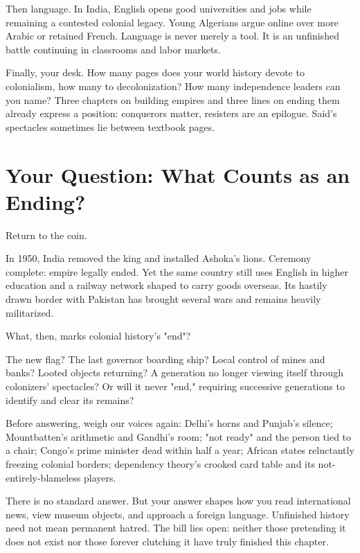 Then language. In India, English opens good universities and jobs while remaining a contested colonial legacy. Young Algerians argue online over more Arabic or retained French. Language is never merely a tool. It is an unfinished battle continuing in classrooms and labor markets.

Finally, your desk. How many pages does your world history devote to colonialism, how many to decolonization? How many independence leaders can you name? Three chapters on building empires and three lines on ending them already express a position: conquerors matter, resisters are an epilogue. Said's spectacles sometimes lie between textbook pages.

\section{Your Question: What Counts as an Ending?}
Return to the coin.

In 1950, India removed the king and installed Ashoka's lions. Ceremony complete: empire legally ended. Yet the same country still uses English in higher education and a railway network shaped to carry goods overseas. Its hastily drawn border with Pakistan has brought several wars and remains heavily militarized.

What, then, marks colonial history's "end"?

The new flag? The last governor boarding ship? Local control of mines and banks? Looted objects returning? A generation no longer viewing itself through colonizers' spectacles? Or will it never "end," requiring successive generations to identify and clear its remains?

Before answering, weigh our voices again: Delhi's horns and Punjab's silence; Mountbatten's arithmetic and Gandhi's room; "not ready" and the person tied to a chair; Congo's prime minister dead within half a year; African states reluctantly freezing colonial borders; dependency theory's crooked card table and its not-entirely-blameless players.

There is no standard answer. But your answer shapes how you read international news, view museum objects, and approach a foreign language. Unfinished history need not mean permanent hatred. The bill lies open: neither those pretending it does not exist nor those forever clutching it have truly finished this chapter.
